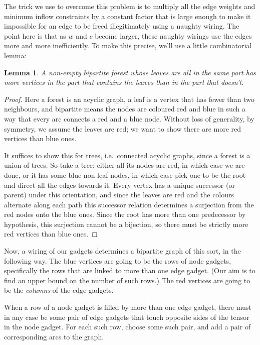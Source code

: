 \documentclass{robinminion}
\newtheorem{lemma}{Lemma}
\begin{document}
The trick we use to overcome this problem is to multiply all the edge weights and minimum inflow constraints by a constant factor that is large enough to make it impossible for an edge to be freed illegitimately using a naughty wiring. The point here is that as $w$ and $c$ become larger, these naughty wirings use the edges more and more inefficiently. To make this precise, we'll use a little combinatorial lemma:

\begin{lemma}
    A non-empty bipartite forest whose leaves are all in the same part has more vertices in the part that contains the leaves than in the part that doesn't.
\end{lemma}
\begin{proof}
Here a forest is an acyclic graph, a leaf is a vertex that has fewer than two neighbours, and bipartite means the nodes are coloured red and blue in such a way that every arc connects a red and a blue node. Without loss of generality, by symmetry, we assume the leaves are red; we want to show there are more red vertices than blue ones.

It suffices to show this for trees, i.e.\ connected acyclic graphs, since a forest is a union of trees. So take a tree: either all its nodes are red, in which case we are done, or it has some blue non-leaf nodes, in which case pick one to be the root and direct all the edges towards it. Every vertex has a unique successor (or parent) under this orientation, and since the leaves are red and the colours alternate along each path this successor relation determines a surjection from the red nodes onto the blue ones. Since the root has more than one predecessor by hypothesis, this surjection cannot be a bijection, so there must be strictly more red vertices than blue ones.
\end{proof}

Now, a wiring of our gadgets determines a bipartite graph of this sort, in the following way. The blue vertices are going to be the rows of node gadgets, specifically the rows that are linked to more than one edge gadget. (Our aim is to find an upper bound on the number of such rows.) The red vertices are going to be the \emph{columns} of the edge gadgets.

When a row of a node gadget is filled by more than one edge gadget, there must in any case be some pair of edge gadgets that touch opposite sides of the tensor in the node gadget. For each such row, choose some such pair, and add a pair of corresponding arcs to the graph.
\end{document}
